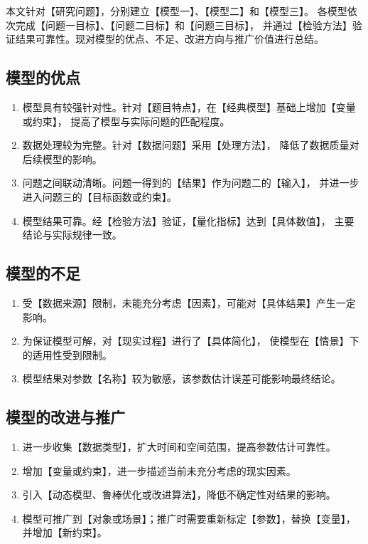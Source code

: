 \documentclass[withoutpreface,bwprint]{cumcmthesis}
\begin{document}
本文针对【研究问题】，分别建立【模型一】、【模型二】和【模型三】。
各模型依次完成【问题一目标】、【问题二目标】和【问题三目标】，
并通过【检验方法】验证结果可靠性。现对模型的优点、不足、改进方向与推广价值进行总结。

\subsection{模型的优点}

\begin{enumerate}[itemindent=2em]
	\item 模型具有较强针对性。针对【题目特点】，在【经典模型】基础上增加【变量或约束】，
	提高了模型与实际问题的匹配程度。

	\item 数据处理较为完整。针对【数据问题】采用【处理方法】，
	降低了数据质量对后续模型的影响。

	\item 问题之间联动清晰。问题一得到的【结果】作为问题二的【输入】，
	并进一步进入问题三的【目标函数或约束】。

	\item 模型结果可靠。经【检验方法】验证，【量化指标】达到【具体数值】，
	主要结论与实际规律一致。
\end{enumerate}

\subsection{模型的不足}

\begin{enumerate}[itemindent=2em]
	\item 受【数据来源】限制，未能充分考虑【因素】，可能对【具体结果】产生一定影响。

	\item 为保证模型可解，对【现实过程】进行了【具体简化】，
	使模型在【情景】下的适用性受到限制。

	\item 模型结果对参数【名称】较为敏感，该参数估计误差可能影响最终结论。
\end{enumerate}

\subsection{模型的改进与推广}

\begin{enumerate}[itemindent=2em]
	\item 进一步收集【数据类型】，扩大时间和空间范围，提高参数估计可靠性。

	\item 增加【变量或约束】，进一步描述当前未充分考虑的现实因素。

	\item 引入【动态模型、鲁棒优化或改进算法】，降低不确定性对结果的影响。

	\item 模型可推广到【对象或场景】；推广时需要重新标定【参数】，替换【变量】，并增加【新约束】。
\end{enumerate}
\end{document}
